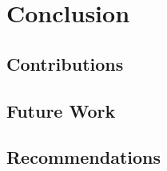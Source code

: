 \chapter{Conclusion}
\label{ch:conclusion}


\section{Contributions}
\label{sec:contributions}

\section{Future Work}
\label{sec:future-work}

\section{Recommendations}
